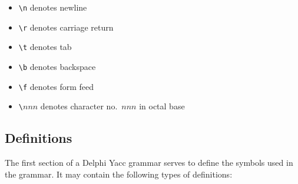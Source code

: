 \documentclass[a4paper]{article}
\begin{document}
\begin{itemize}
   \item \verb"\n"     denotes newline
   \item \verb"\r"     denotes carriage return
   \item \verb"\t"     denotes tab
   \item \verb"\b"     denotes backspace
   \item \verb"\f"     denotes form feed
   \item \verb"\"$nnn$ denotes character no.\ $nnn$ in octal base
\end{itemize}

\subsection{Definitions}

The first section of a Delphi Yacc grammar serves to define the symbols used in
the grammar. It may contain the following types of definitions:
\end{document}
